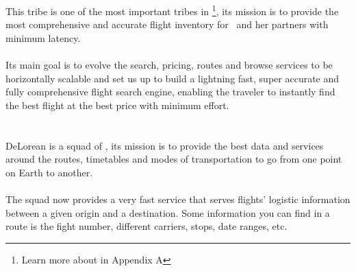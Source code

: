 
\section{\tribe}

This tribe\cite{marketplace_engine_home} is one of the most important tribes in \company\footnote{Learn more about \textit{} in Appendix A}, its mission is to provide the most comprehensive and accurate flight inventory for \company\ and her partners with minimum latency.
\\\\
Its main goal is to evolve the search, pricing, routes and browse services to be horizontally scalable and set us up to build a lightning fast, super accurate and fully comprehensive flight search engine, enabling the traveler to instantly find the best flight at the best price with minimum effort.


\section{\squad}

DeLorean\cite{delorean_squad_home} is a squad of \tribe, its mission is to provide the best data and services around the routes, timetables and modes of transportation to go from one point on Earth to another.
\\\\
The squad now provides a very fast service that serves flights' logistic information between a given origin and a destination. Some information you can find in a route is the fight number, different carriers, stops, date ranges, etc.